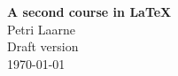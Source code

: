 \documentclass[a4paper, 11pt]{report}
\begin{document}
\begin{titlepage}

\hrulefill

\begin{flushright}
\textbf{\LARGE A second course in \LaTeX}\\[1em]
\Large Petri Laarne\\[1em]
Draft version\\
\today
\end{flushright}

\hrulefill

\end{titlepage}

\tableofcontents













\printindex
\printbibliography


\end{document}
